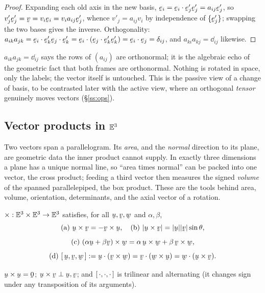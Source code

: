 \begin{proof}
Expanding each old axis in the new basis,
$\be_{i}=\ip{\be_{i}}{\be'_{j}}\be'_{j}=a_{ij}\be'_{j}$, so
$v'_{j}\be'_{j}=\bv=v_{i}\be_{i}=v_{i}a_{ij}\be'_{j}$, whence
$v'_{j}=a_{ij}v_{i}$ by independence of $\{\be'_{j}\}$; swapping the two
bases gives the inverse. Orthogonality:
$a_{ik}a_{jk}=\ip{\be_{i}}{\be'_{k}}\ip{\be_{j}}{\be'_{k}}
=\ip{\be_{i}}{(\ip{\be_{j}}{\be'_{k}}\be'_{k})}=\ip{\be_{i}}{\be_{j}}
=\dd_{ij}$, and $a_{ki}a_{kj}=\dd_{ij}$ likewise.
\end{proof}

\begin{remark}\label{rem:cobintuition}
$a_{ik}a_{jk}=\dd_{ij}$ says the rows of $(a_{ij})$ are orthonormal; it is
the algebraic echo of the geometric fact that both frames are orthonormal.
Nothing is rotated in space, only the labels; the vector itself is
untouched. This is the passive view of a change of basis, to be contrasted
later with the active view, where an orthogonal \emph{tensor} genuinely
moves vectors (\S\ref{ss:ops}).
\end{remark}

\subsection{Vector products in $\mathbb{E}^{3}$}\label{ss:cross}

Two vectors span a parallelogram. Its \emph{area}, and the \emph{normal}
direction to its plane, are geometric data the inner product cannot supply.
In exactly three dimensions a plane has a unique normal line, so ``area
times normal'' can be packed into one vector, the cross product; feeding a
third vector then measures the signed \emph{volume} of the spanned
parallelepiped, the box product. These are the tools behind area, volume,
orientation, determinants, and the axial vector of a rotation.

\begin{definition}\label{def:cross}
$\times:\mathbb{E}^{3}\times\mathbb{E}^{3}\to\mathbb{E}^{3}$ satisfies, for all $\bu,\bv,\bw$ and
$\alpha,\beta$,
\[
\text{(a)}\ \bu\times\bv=-\bv\times\bu,\quad
\text{(b)}\ |\bu\times\bv|=|\bu||\bv|\sin\theta,
\]
\[
\text{(c)}\ (\alpha\bu+\beta\bv)\times\bw
 =\alpha\,\bu\times\bw+\beta\,\bv\times\bw,
\]
\[
\text{(d)}\ \tbox\bu\bv\bw:=\ip\bu{(\bv\times\bw)}
=\ip\bv{(\bw\times\bu)}=\ip\bw{(\bu\times\bv)}.
\]
\end{definition}

\begin{proposition}\label{prop:boxprops}
$\bu\times\bu=\bze$; $\bu\times\bv\perp\bu,\bv$; and $[\,\cdot,\cdot,\cdot\,]$
is trilinear and alternating (it changes sign under any transposition of
its arguments).
\end{proposition}

